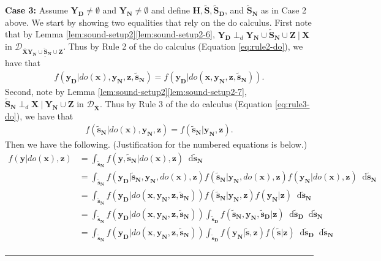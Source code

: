 \documentclass[twoside]{article}
\newcommand\given[1][]{\:#1\vert\:}
\newcommand{\mb}[1]{\mathbf{#1}}
\newcommand{\dsepp}{\perp_{d}}
\newcommand{\g}[1][G]{\mathcal{#1}}
\newcommand*\diff{\mathop{}\!\mathrm{d}}
\newenvironment{proofof}[1][]{\begin{trivlist}
\item[\hskip \labelsep {\bfseries Proof of #1.}]}{\hfill\BlackBox\end{trivlist}}
\newcommand{\BlackBox}{\rule{1.5ex}{1.5ex}}
\begin{document}
\begin{proofof}[Theorem \ref{thm:soundness}]
    \textbf{Case 3:} Assume $\mb{Y_D} \neq \emptyset$ and $\mb{Y_N} \neq \emptyset$ and define $\mb{H}, \mb{\tilde{S}}, \mb{\tilde{S}_D}$, and $\mb{\tilde{S}_N}$ as in Case 2 above. We start by showing two equalities that rely on the do calculus. First note that by Lemma \ref{lem:sound-setup2}\ref{lem:sound-setup2-6}, $\mb{Y_D} \dsepp \mb{Y_N} \cup \mb{\tilde{S}_N} \cup \mb{Z} \given \mb{X}$ in $\g[D]_{\overline{\mb{X}}\underline{\mb{Y_N} \cup \mb{\tilde{S}_N} \cup \mb{Z}}}$. Thus by Rule 2 of the do calculus (Equation \eqref{eq:rule2-do}), we have that 
    \begin{align}
        {f(\mb{y_D} | do(\mb{x}),\mb{y_N, z,\tilde{s}_N}) = f(\mb{y_D} | do(\mb{x,y_N,z,\tilde{s}_N})).} \label{eq:soundness-8}
    \end{align}
    Second, note by Lemma \ref{lem:sound-setup2}\ref{lem:sound-setup2-7}, $\mb{\tilde{S}_N} \dsepp \mb{X} \given \mb{Y_N} \cup \mb{Z}$ in $\g[D]_{\overline{\mb{X}}}$. Thus by Rule 3 of the do calculus (Equation \eqref{eq:rule3-do}), we have that
    \begin{align}
        {f(\mb{\tilde{s}_N} | do(\mb{x}),\mb{y_N,z}) = f(\mb{\tilde{s}_N} | \mb{y_N,z}).} \label{eq:soundness-9}
    \end{align}
    Then we have the following. (Justification for the numbered equations is below.)
    \begin{align}
        f(\mb{y} | do(\mb{x}), \mb{z})
            &= \int_{\mb{\tilde{s}_N}} f(\mb{y,\tilde{s}_N} | do(\mb{x}), \mb{z}) \diff \mb{\tilde{s}_N} \nonumber \\
            &= \int_{\mb{\tilde{s}_N}} f(\mb{y_D} | \mb{\tilde{s}_N,y_N}, do(\mb{x}), \mb{z}) f(\mb{\tilde{s}_N} | \mb{y_N}, do(\mb{x}), \mb{z}) f(\mb{y_N} | do(\mb{x}), \mb{z}) \diff \mb{\tilde{s}_N} \nonumber \\
            &= \int_{\mb{\tilde{s}_N}} f(\mb{y_D} | do(\mb{x,y_N,z,\tilde{s}_N})) f(\mb{\tilde{s}_N} | \mb{y_N, z}) f(\mb{y_N} | \mb{z}) \diff \mb{\tilde{s}_N} \label{eq:soundness-10} \\
            &= \int_{\mb{\tilde{s}_N}} f(\mb{y_D} | do(\mb{x,y_N,z,\tilde{s}_N})) \int_{\mb{\tilde{s}_D}} f(\mb{\tilde{s}_N,y_N,\tilde{s}_D} | \mb{z}) \diff \mb{\tilde{s}_D} \diff \mb{\tilde{s}_N} \nonumber \\
            &= \int_{\mb{\tilde{s}_N}} f(\mb{y_D} | do(\mb{x,y_N,z,\tilde{s}_N})) \int_{\mb{\tilde{s}_D}} f(\mb{y_N} | \mb{\tilde{s},z}) f(\mb{\tilde{s}} | \mb{z}) \diff \mb{\tilde{s}_D} \diff \mb{\tilde{s}_N} \nonumber \\

\end{align}
\end{proofof}
\end{document}

